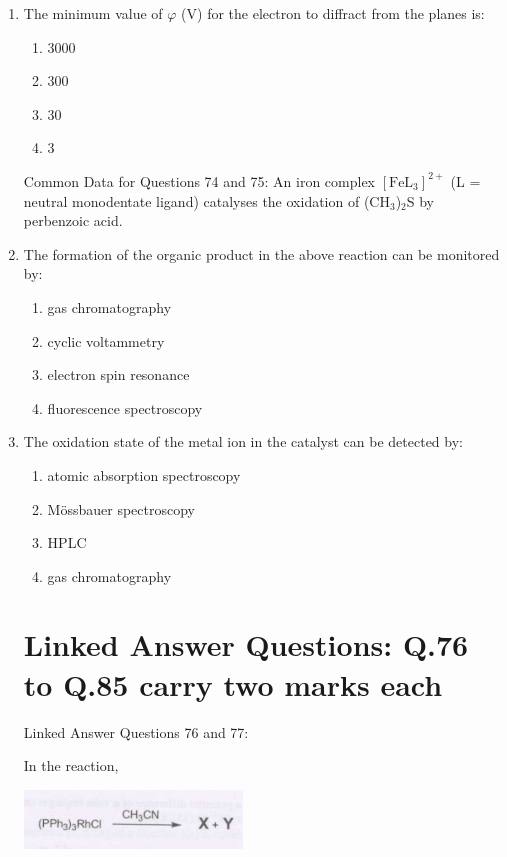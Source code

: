 \documentclass[12pt]{article}
\begin{document}
\begin{enumerate}
    \item The minimum value of $\varphi$ (V) for the electron to diffract from the  planes is:
    \begin{enumerate}
        \item 3000
        \item 300
        \item 30
        \item 3
    \end{enumerate}
    \hfill{}


{Common Data for Questions 74 and 75:} 
An iron complex $[\text{FeL}_3]^{2+}$ (L = neutral monodentate ligand) catalyses the oxidation of (CH$_3$)$_2$S by perbenzoic acid.


    \item The formation of the organic product in the above reaction can be monitored by:
    \begin{enumerate}
        \item gas chromatography
        \item cyclic voltammetry
        \item electron spin resonance
        \item fluorescence spectroscopy
    \end{enumerate}    \hfill{}


    \item The oxidation state of the metal ion in the catalyst can be detected by:
    \begin{enumerate}
        \item atomic absorption spectroscopy
        \item M\"ossbauer spectroscopy
        \item HPLC
        \item gas chromatography
    \end{enumerate}
  \hfill{}


\section{Linked Answer Questions: Q.76 to Q.85 carry two marks each}

{Linked Answer Questions 76 and 77:}

In the reaction,

\begin{center}
\includegraphics[width=0.6\columnwidth]{figs/q76 1.png}
\end{center} 



\end{enumerate}
\end{document}
